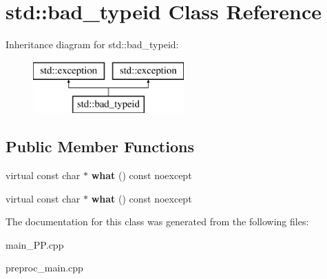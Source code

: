 \hypertarget{classstd_1_1bad__typeid}{\section{std\+:\+:bad\+\_\+typeid Class Reference}
\label{classstd_1_1bad__typeid}
}
Inheritance diagram for std\+:\+:bad\+\_\+typeid\+:\begin{figure}[H]
\begin{center}
\leavevmode
\includegraphics[height=2.000000cm]{classstd_1_1bad__typeid}
\end{center}
\end{figure}
\subsection*{Public Member Functions}
\begin{DoxyCompactItemize}
\item 
\hypertarget{classstd_1_1bad__typeid_ad423bab305d43240e9798c55778ca199}{virtual const char $\ast$ {\bfseries what} () const noexcept}\label{classstd_1_1bad__typeid_ad423bab305d43240e9798c55778ca199}

\item 
\hypertarget{classstd_1_1bad__typeid_ad423bab305d43240e9798c55778ca199}{virtual const char $\ast$ {\bfseries what} () const noexcept}\label{classstd_1_1bad__typeid_ad423bab305d43240e9798c55778ca199}

\end{DoxyCompactItemize}


The documentation for this class was generated from the following files\+:\begin{DoxyCompactItemize}
\item 
main\+\_\+\+P\+P.\+cpp\item 
preproc\+\_\+main.\+cpp\end{DoxyCompactItemize}
